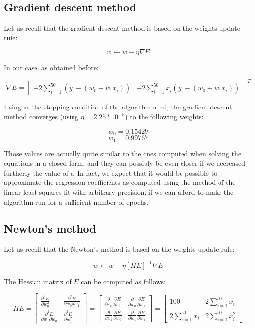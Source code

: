 \documentclass[letterpaper,headings=standardclasses]{scrartcl}
\begin{document}
\subsection{Gradient descent method}

Let us recall that the gradient descent method is based on the weights update rule:

$$ w \leftarrow w - \eta \nabla E $$

In our case, as obtained before:

$$ \nabla E = \left[ \begin{matrix} -2 \sum_{i = 1}^{50} (y_i - (w_0 + w_1 x_i)) & -2 \sum_{i = 1}^{50} x_i (y_i - (w_0 + w_1 x_i)) \end{matrix} \right]^T $$

Using as the stopping condition of the algorithm a mi, the gradient descent method converges (using $\eta = 2.25 * 10^{-5}$) to the following weights:

$$ w_0 = 0.15429 $$
$$ w_1 = 0.99767 $$

Those values are actually quite similar to the ones computed when solving the equations in a closed form, and they can possibly be even closer if we decreased furtherly the value of $\epsilon$. In fact, we expect that it would be possible to approximate the regression coefficients as computed using the method of the linear least squares fit with arbitrary precision, if we can afford to make the algorithm run for a sufficient number of epochs.

\subsection{Newton's method}

Let us recall that the Newton's method is based on the weights update rule:

$$ w \leftarrow w - \eta [HE]^{-1} \nabla E $$

The Hessian matrix of $E$ can be computed as follows:

$$ HE = \left[ \begin{matrix} \frac{\partial^2 E}{\partial w_0^2} & \frac{\partial^2 E}{\partial w_0 \partial w_1} \\[0.5em] \frac{\partial^2 E}{\partial w_1 \partial w_0} & \frac{\partial^2 E}{\partial w_1^2} \end{matrix} \right] = \left[ \begin{matrix} \frac{\partial}{\partial w_0} \frac{\partial E}{\partial w_0} & \frac{\partial}{\partial w_0} \frac{\partial E}{\partial w_1} \\[0.5em] \frac{\partial}{\partial w_1} \frac{\partial E}{\partial w_0} & \frac{\partial}{\partial w_1} \frac{\partial E}{\partial w_1} \end{matrix} \right] = \left[ \begin{matrix} 100 & 2 \sum_{i = 1}^{50} x_i \\[0.5em] 2 \sum_{i = 1}^{50} x_i & 2 \sum_{i = 1}^{50} x_i^2 \end{matrix} \right] $$
\end{document}
